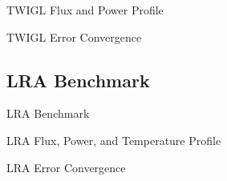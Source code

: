 \documentclass[8pt]{beamer}
\begin{document}
\begin{frame}{TWIGL Flux and Power Profile}

\end{frame}

\begin{frame}{TWIGL Error Convergence}
%
%
%
\end{frame}

\subsection{LRA Benchmark}

\begin{frame}{LRA Benchmark}


\end{frame}

\begin{frame}{LRA Flux, Power, and Temperature Profile}

\end{frame}

\begin{frame}{LRA Error Convergence}
%
%
%
\end{frame}
\end{document}
